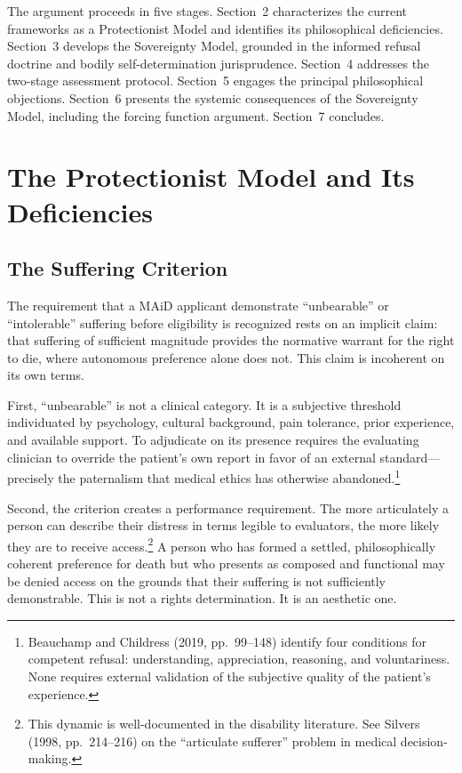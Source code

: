 \documentclass[11pt, letterpaper]{article}
\begin{document}
The argument proceeds in five stages. Section~2 characterizes the current frameworks as
a Protectionist Model and identifies its philosophical deficiencies. Section~3 develops
the Sovereignty Model, grounded in the informed refusal doctrine and bodily
self-determination jurisprudence. Section~4 addresses the two-stage assessment protocol.
Section~5 engages the principal philosophical objections. Section~6 presents the systemic
consequences of the Sovereignty Model, including the forcing function argument.
Section~7 concludes.

\section{The Protectionist Model and Its Deficiencies}

\subsection{The Suffering Criterion}

The requirement that a MAiD applicant demonstrate ``unbearable'' or ``intolerable''
suffering before eligibility is recognized rests on an implicit claim: that suffering
of sufficient magnitude provides the normative warrant for the right to die, where
autonomous preference alone does not. This claim is incoherent on its own terms.

First, ``unbearable'' is not a clinical category. It is a subjective threshold
individuated by psychology, cultural background, pain tolerance, prior experience,
and available support. To adjudicate on its presence requires the evaluating clinician
to override the patient's own report in favor of an external standard---precisely the
paternalism that medical ethics has otherwise abandoned.\footnote{%
  Beauchamp and Childress (2019, pp.\ 99--148) identify four conditions for competent
  refusal: understanding, appreciation, reasoning, and voluntariness. None requires
  external validation of the subjective quality of the patient's experience.}

Second, the criterion creates a performance requirement. The more articulately a person
can describe their distress in terms legible to evaluators, the more likely they are
to receive access.\footnote{%
  This dynamic is well-documented in the disability literature. See Silvers (1998,
  pp.\ 214--216) on the ``articulate sufferer'' problem in medical decision-making.}
A person who has formed a settled, philosophically coherent preference for death but
who presents as composed and functional may be denied access on the grounds that their
suffering is not sufficiently demonstrable. This is not a rights determination. It is
an aesthetic one.
\end{document}
